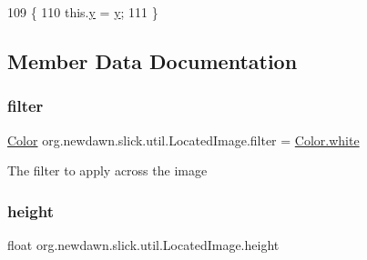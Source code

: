 \begin{DoxyCode}
109                             \{
110         this.\mbox{\hyperlink{classorg_1_1newdawn_1_1slick_1_1util_1_1_located_image_ad6f8eeb5d7712227a3b3eeaad97c8d85}{y}} = \mbox{\hyperlink{classorg_1_1newdawn_1_1slick_1_1util_1_1_located_image_ad6f8eeb5d7712227a3b3eeaad97c8d85}{y}};
111     \}
\end{DoxyCode}


\subsection{Member Data Documentation}
\mbox{\label{classorg_1_1newdawn_1_1slick_1_1util_1_1_located_image_a7da79f9d1623c00f82e1a5869d69a970}} 
\subsubsection{\texorpdfstring{filter}{filter}}
{\footnotesize\ttfamily \mbox{\hyperlink{classorg_1_1newdawn_1_1slick_1_1_color}{Color}} org.\+newdawn.\+slick.\+util.\+Located\+Image.\+filter = \mbox{\hyperlink{classorg_1_1newdawn_1_1slick_1_1_color_afcd91cbdd26233d226d734f70dca3d2e}{Color.\+white}}\hspace{0.3cm}{\ttfamily [private]}}

The filter to apply across the image \mbox{\label{classorg_1_1newdawn_1_1slick_1_1util_1_1_located_image_abeb19801d483aa7fdd249c15c535edaf}} 
\subsubsection{\texorpdfstring{height}{height}}
{\footnotesize\ttfamily float org.\+newdawn.\+slick.\+util.\+Located\+Image.\+height\hspace{0.3cm}{\ttfamily [private]}}

